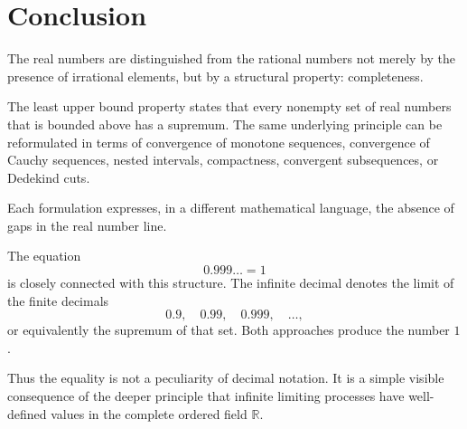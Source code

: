 \documentclass{essay}
\begin{document}
\section{Conclusion}

The real numbers are distinguished from the rational numbers not merely by the presence of irrational elements, but by a structural property: completeness.

The least upper bound property states that every nonempty set of real numbers that is bounded above has a supremum. The same underlying principle can be reformulated in terms of convergence of monotone sequences, convergence of Cauchy sequences, nested intervals, compactness, convergent subsequences, or Dedekind cuts.

Each formulation expresses, in a different mathematical language, the absence of gaps in the real number line.

The equation
\[
0.999\ldots=1
\]
is closely connected with this structure. The infinite decimal denotes the limit of the finite decimals
\[
0.9,\quad0.99,\quad0.999,\quad\ldots,
\]
or equivalently the supremum of that set. Both approaches produce the number \(1\).

Thus the equality is not a peculiarity of decimal notation. It is a simple visible consequence of the deeper principle that infinite limiting processes have well-defined values in the complete ordered field \(\mathbb{R}\).
\end{document}
